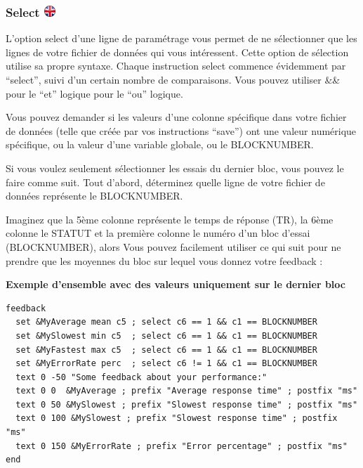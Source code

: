 \documentclass[
]{book}
\begin{document}
\hypertarget{select}{%
\subsubsection[Select ]{\texorpdfstring{Select
\href{https://www.psytoolkit.org/doc3.1.0/feedback.html\#_select}{\protect\includegraphics{img/ukflag.png}}}{Select }}\label{select}}

L'option select d'une ligne de paramétrage vous permet de ne
sélectionner que les lignes de votre fichier de données qui vous
intéressent. Cette option de sélection utilise sa propre syntaxe. Chaque
instruction select commence évidemment par ``select'', suivi d'un
certain nombre de comparaisons. Vous pouvez utiliser \&\& pour le ``et''
logique \textbar\textbar{} pour le ``ou'' logique.

Vous pouvez demander si les valeurs d'une colonne spécifique dans votre
fichier de données (telle que créée par vos instructions ``save'') ont
une valeur numérique spécifique, ou la valeur d'une variable globale, ou
le BLOCKNUMBER.

Si vous voulez seulement sélectionner les essais du dernier bloc, vous
pouvez le faire comme suit. Tout d'abord, déterminez quelle ligne de
votre fichier de données représente le BLOCKNUMBER.

Imaginez que la 5ème colonne représente le temps de réponse (TR), la
6ème colonne le STATUT et la première colonne le numéro d'un bloc
d'essai (BLOCKNUMBER), alors Vous pouvez facilement utiliser ce qui suit
pour ne prendre que les moyennes du bloc sur lequel vous donnez votre
feedback :

\textbf{Exemple d'ensemble avec des valeurs uniquement sur le dernier
bloc}

\begin{verbatim}
feedback
  set &MyAverage mean c5 ; select c6 == 1 && c1 == BLOCKNUMBER
  set &MySlowest min c5  ; select c6 == 1 && c1 == BLOCKNUMBER
  set &MyFastest max c5  ; select c6 == 1 && c1 == BLOCKNUMBER
  set &MyErrorRate perc  ; select c6 != 1 && c1 == BLOCKNUMBER
  text 0 -50 "Some feedback about your performance:"
  text 0 0  &MyAverage ; prefix "Average response time" ; postfix "ms"
  text 0 50 &MySlowest ; prefix "Slowest response time" ; postfix "ms"
  text 0 100 &MySlowest ; prefix "Slowest response time" ; postfix "ms"
  text 0 150 &MyErrorRate ; prefix "Error percentage" ; postfix "ms"
end
\end{verbatim}
\end{document}
